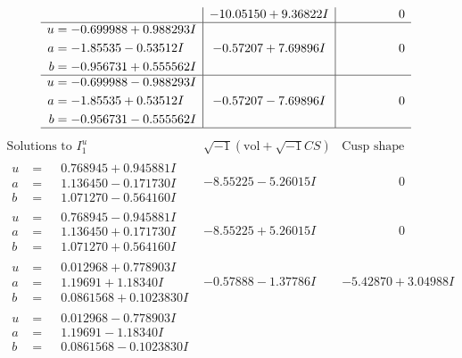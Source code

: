 \documentclass[1p]{elsarticle_modified}
\theoremstyle{definition}
\newcommand{\I}{\sqrt{-1}}
\begin{document}
$$\begin{array}{c|c|c}
 & -10.05150 + 9.36822 I & \phantom{-0.000000 } 0 \\ \hline\begin{aligned}
u &= -0.699988 + 0.988293 I \\
a &= -1.85535 - 0.53512 I \\
b &= -0.956731 + 0.555562 I\end{aligned}
 & -0.57207 + 7.69896 I & \phantom{-0.000000 } 0 \\ \hline\begin{aligned}
u &= -0.699988 - 0.988293 I \\
a &= -1.85535 + 0.53512 I \\
b &= -0.956731 - 0.555562 I\end{aligned}
 & -0.57207 - 7.69896 I & \phantom{-0.000000 } 0\\
 \hline 
 \end{array}$$\newpage$$\begin{array}{c|c|c}  
\text{Solutions to }I^u_{1}& \I (\text{vol} + \sqrt{-1}CS) & \text{Cusp shape}\\
 \hline 
\begin{aligned}
u &= \phantom{-}0.768945 + 0.945881 I \\
a &= \phantom{-}1.136450 - 0.171730 I \\
b &= \phantom{-}1.071270 - 0.564160 I\end{aligned}
 & -8.55225 - 5.26015 I & \phantom{-0.000000 } 0 \\ \hline\begin{aligned}
u &= \phantom{-}0.768945 - 0.945881 I \\
a &= \phantom{-}1.136450 + 0.171730 I \\
b &= \phantom{-}1.071270 + 0.564160 I\end{aligned}
 & -8.55225 + 5.26015 I & \phantom{-0.000000 } 0 \\ \hline\begin{aligned}
u &= \phantom{-}0.012968 + 0.778903 I \\
a &= \phantom{-}1.19691 + 1.18340 I \\
b &= \phantom{-}0.0861568 + 0.1023830 I\end{aligned}
 & -0.57888 - 1.37786 I & -5.42870 + 3.04988 I \\ \hline\begin{aligned}
u &= \phantom{-}0.012968 - 0.778903 I \\
a &= \phantom{-}1.19691 - 1.18340 I \\
b &= \phantom{-}0.0861568 - 0.1023830 I\end{aligned}

\end{array}$$
\end{document}
